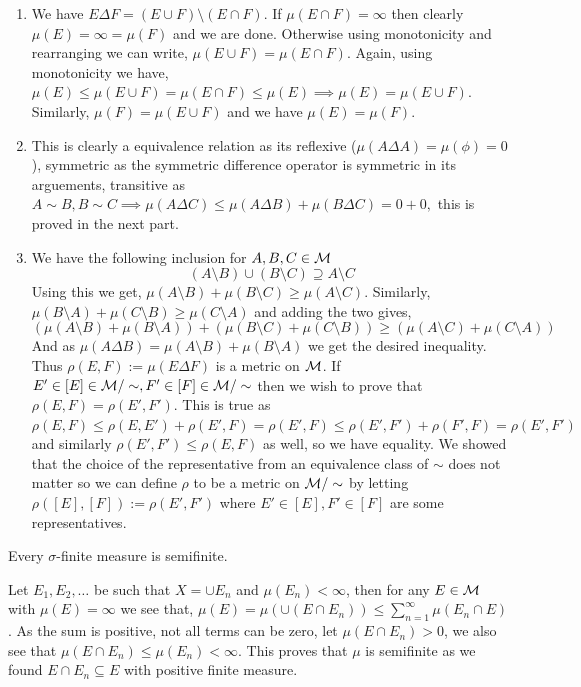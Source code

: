\documentclass[12pt,a4paper]{article}
\begin{document}
\begin{solution}
    \begin{enumerate}
        \item We have $E\Delta F=(E\cup F)\setminus (E\cap F)$.
        If $\mu(E\cap F)=\infty$ then clearly $\mu(E)=\infty=\mu(F)$ and we are done.
        Otherwise using monotonicity and rearranging we can write, $\mu(E\cup F)=\mu(E\cap F)$.
        Again, using monotonicity we have, $\mu(E)\leq\mu(E\cup F)=\mu(E\cap F)\leq\mu(E)\implies\mu(E)=\mu(E\cup F)$.
        Similarly, $\mu(F)=\mu(E\cup F)$ and we have $\mu(E)=\mu(F).$
        \item This is clearly a equivalence relation as its reflexive ($\mu(A\Delta A)=\mu(\phi)=0$), symmetric as the symmetric difference operator is symmetric in its arguements, transitive as $A\sim B,B\sim C\implies\mu(A\Delta C)\leq\mu(A\Delta B)+\mu(B\Delta C)=0+0,$ this is proved in the next part.
        \item We have the following inclusion for $A,B,C\in\mathcal{M}$
        $$(A\setminus B)\cup (B\setminus C)\supseteq A\setminus C$$
        Using this we get, $\mu(A\setminus B)+\mu(B\setminus C)\geq\mu(A\setminus C).$ 
        Similarly, $\mu(B\setminus A)+\mu(C\setminus B)\geq\mu(C\setminus A)$ and adding the two gives,
        $$(\mu(A\setminus B)+\mu(B\setminus A))+(\mu(B\setminus C)+\mu(C\setminus B))\geq (\mu(A\setminus C)+\mu(C\setminus A))$$
        And as $\mu(A\Delta B)=\mu(A\setminus B)+\mu(B\setminus A)$ we get the desired inequality. 
        Thus $\rho(E,F):=\mu(E\Delta F)$ is a metric on $\mathcal{M}$. If $E'\in[E]\in\mathcal{M}/\sim, F'\in[F]\in\mathcal{M}/\sim$ then we wish to prove that $\rho(E,F)=\rho(E',F')$. 
        This is true as $\rho(E,F)\leq\rho(E,E')+\rho(E',F)=\rho(E',F)\leq\rho(E',F')+\rho(F',F)=\rho(E',F')$ and similarly $\rho(E',F')\leq\rho(E,F)$ as well, so we have equality. 
        We showed that the choice of the representative from an equivalence class of $\sim$ does not matter so we can define $\rho$ to be a metric on $\mathcal{M}/\sim$ by letting $\rho([E],[F]):=\rho(E',F')$ where $E'\in[E],F'\in[F]$ are some representatives.
    \end{enumerate}
\end{solution}
\begin{problem}\label{prob:1-13}
Every $\sigma$-finite measure is semifinite.
\end{problem}
\begin{solution}
    Let $E_1,E_2,\ldots$ be such that $X=\cup E_n$ and $\mu(E_n)<\infty$, then for any $E\in\mathcal{M}$ with $\mu(E)=\infty$ we see that, $\mu(E)=\mu(\cup(E\cap E_n))\leq\sum_{n=1}^\infty \mu(E_n\cap E)$. 
    As the sum is positive, not all terms can be zero, let $\mu(E\cap E_n)>0$, we also see that $\mu(E\cap E_n)\leq\mu(E_n)<\infty$. 
    This proves that $\mu$ is semifinite as we found $E\cap E_n\subseteq E$ with positive finite measure.
\end{solution}
\end{document}
